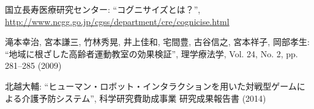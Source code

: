 \documentclass{jarticle}
\begin{document}

\begin{thebibliography}{9}

国立長寿医療研究センター: ``コグニサイズとは？'', \url{http://www.ncgg.go.jp/cgss/department/cre/cognicise.html}



滝本幸治, 宮本謙三, 竹林秀晃, 井上佳和, 宅間豊, 古谷信之, 宮本祥子, 岡部孝生: ``地域に根ざした高齢者運動教室の効果検証'', 理学療法学, Vol. 24, No. 2, pp. 281--285 (2009)

北越大輔: ``ヒューマン・ロボット・インタラクションを用いた対戦型ゲームによる介護予防システム'', 科学研究費助成事業 研究成果報告書 (2014)

\end{thebibliography}
\end{document}
